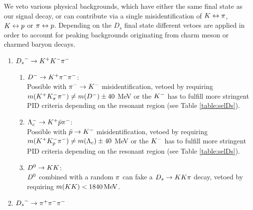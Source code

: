 We veto various physical backgrounds, which have either the same final state as our signal decay, or can contribute via a single misidentification of ${K} \leftrightarrow {\ensuremath{\pi}}$, ${K}\leftrightarrow{\ensuremath{p}}$ or $\pi \leftrightarrow{\ensuremath{p}}$. 
Depending on the $D_s$ final state different vetoes are applied in order to account for peaking backgrounds originating from charm meson or charmed baryon decays.
\begin{enumerate}

\item ${{D}_{s}}^-\rightarrow{\ensuremath{K}}^+{K}^-{\pi}^-$

\begin{enumerate}
	\item ${{D}^-} \rightarrow{\ensuremath{{K}^+}}{\ensuremath{{\pi}^-}}{\ensuremath{{\pi}^-}}$: \\
	Possible with ${{\pi}^-}\rightarrow{\ensuremath{{K}^-}}$ misidentification, vetoed by requiring 
	$m({{K}^+} K^-_\pi {\ensuremath{{\pi}^-}}) \ne m(D^-) \pm 40$ MeV 
	or the ${{K}^-}$ has to fulfill more stringent PID criteria depending on the resonant region (see Table  \ref{table:selDs}).
	
	\item $\Lambda_c^- \rightarrow {\ensuremath{{K}^+}} \bar p {{\pi}^-} $:  \\
	Possible with $\bar p \rightarrow{\ensuremath{{K}^-}}$ misidentification, vetoed by requiring
	$m({{K}^+} K^-_p {{\pi}^-}) \ne m(\Lambda_c) \pm 40$ MeV
	or the ${{K}^-}$ has to fulfill more stringent PID criteria depending on the resonant region (see Table  \ref{table:selDs}).
	
	\item ${{D}^0}\rightarrow{\ensuremath{K}}{\ensuremath{K}}$: \\
	${{D}^0}$ combined with a random ${\pi}$ can fake a ${{D}_{s}}\rightarrow{\ensuremath{K}}{\ensuremath{K}}{\ensuremath{\pi}}$ decay, vetoed by requiring $m({K}{K}) < 1840 \mathrm{\,Me\kern -0.1em V}$. 
\end{enumerate}

\item ${{D}_{s}}^-\rightarrow{\ensuremath{\pi}}^+{\pi}^-{\pi}^-$

\begin{enumerate}




\end{enumerate}
\end{enumerate}
